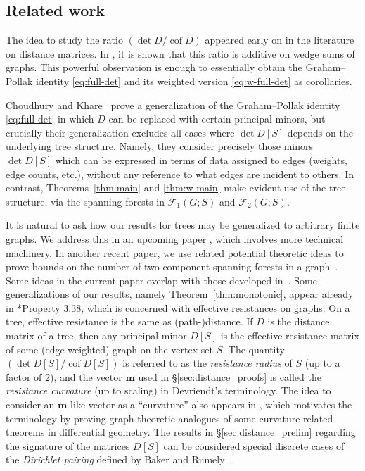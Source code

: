 \documentclass[12pt]{amsart}
\theoremstyle{definition}
\newcommand{\boldm}{\mathbf{m}}
\DeclareMathOperator{\cof}{cof}
\newcommand{\forests}{\mathcal{F}}
\begin{document}
\subsection{Related work}

The idea to study the ratio $({\det D}/{\cof D})$ appeared early on in the literature on distance matrices.
In \cite{graham-hoffman-hosoya}, it is shown that this ratio is additive on wedge sums of graphs.
This powerful observation is enough to essentially obtain the Graham--Pollak identity \eqref{eq:full-det} and its weighted version \eqref{eq:w-full-det} as corollaries.

Choudhury and Khare~\cite{choudhury-khare} prove a generalization of the Graham--Pollak identity \eqref{eq:full-det} in which $D$ can be replaced with certain principal minors, but crucially their generalization excludes all cases where $\det D[S]$ depends on the underlying tree structure.
Namely, they consider precisely those minors $\det D[S]$ which can be expressed in terms of data assigned to edges (weights, edge counts, etc.), without any reference to what edges are incident to others.
In contrast, Theorems~\ref{thm:main} and \ref{thm:w-main} make evident use of the tree structure, via the spanning forests in $\forests_1(G; S)$ and $\forests_2(G; S)$.

It is natural to ask how our results for trees may be generalized to arbitrary finite graphs. We address this in an upcoming paper \cite{richman-shokrieh-wu}, which involves more technical machinery.
In another recent paper, we use related potential theoretic ideas to prove bounds on the number of two-component spanning forests in a graph~\cite{richman-shokrieh-wu-2}.
Some ideas in the current paper overlap with those developed in~\cite{devriendt-thesis}.
Some generalizations of our results, namely Theorem~\ref{thm:monotonic}, appear already in \cite{devriendt-thesis}*{Property 3.38}, which is concerned with effective resistances on graphs.
On a tree, effective resistance is the same as (path-)distance.
If $D$ is the distance matrix of a tree, then any principal minor $D[S]$ is the effective resistance matrix of some (edge-weighted) graph on the vertex set $S$.
The quantity $(\det D[S] / \cof D[S])$ is referred to as the {\em resistance radius} of $S$ (up to a factor of $2$),
and the vector $\boldm$ used in \S\ref{sec:distance_proofs} is called the {\em resistance curvature} (up to scaling) in Devriendt's terminology.
The idea to consider an $\boldm$-like vector as a ``curvature'' also appears in \cite{steinerberger}, which motivates the terminology by proving graph-theoretic analogues of some curvature-related theorems in differential geometry. 
The results in \S\ref{sec:distance_prelim} regarding the signature of the matrices $D[S]$ can be considered special discrete cases of the {\em Dirichlet pairing} defined by
Baker and Rumely~\cite{baker-rumely}.
\end{document}
